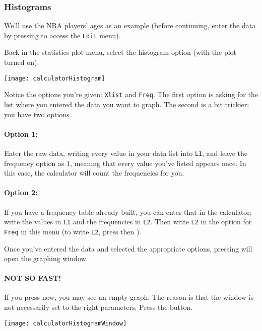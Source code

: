 \subsubsection{Histograms}
We'll use the NBA players' ages as an example (before continuing, enter the data by pressing   to access the \texttt{Edit} menu).

Back in the statistics plot menu, select the histogram option (with the plot turned on).
\begin{center}
\texttt{[image: calculatorHistogram]}
\end{center}

Notice the options you're given: \texttt{Xlist} and \texttt{Freq}.  The first option is asking for the list where you entered the data you want to graph.  The second is a bit trickier; you have two options.

\paragraph{Option 1:} Enter the raw data, writing every value in your data list into \texttt{L1}, and leave the frequency option as 1, meaning that every value you've listed appears once.  In this case, the calculator will count the frequencies for you.

\paragraph{Option 2:} If you have a frequency table already built, you can enter that in the calculator; write the values in \texttt{L1} and the frequencies in \texttt{L2}.  Then write \texttt{L2} in the option for \texttt{Freq} in this menu (to write \texttt{L2}, press  then ).

Once you've entered the data and selected the appropriate options, pressing  will open the graphing window.
\pagebreak

\paragraph{NOT SO FAST!} If you press  now, you may see an empty graph.  The reason is that the window is not necessarily set to the right parameters.  Press the  button.
\begin{center}
\texttt{[image: calculatorHistogramWindow]}
\end{center}

